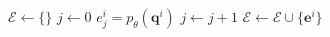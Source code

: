 \documentclass[final]{beamer}
\begin{document}
\begin{frame}{}
\begin{textblock}{25.2}
\begin{algorithmic}[1]
        \State $\mathcal{E}\leftarrow\{\}$
        \State $j\leftarrow 0$
        \State $e^{i}_{j}= p_{\theta}(\mathbf{q}^{i})$
        \State $j\leftarrow j + 1$
        \EndFor
        \State $\mathcal{E}\leftarrow\mathcal{E}\cup\{\mathbf{e}^{i}\}$
        \EndFor
      \end{algorithmic}
      \end{textblock}
      

        
  
    



\end{frame}
\end{document}
